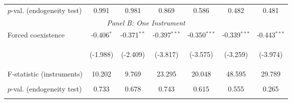 \begin{center}
\begin{tabular}{lcccccc}
\noalign{\smallskip}$ p$-val. (endogeneity test) & 0.991 & 0.981 & 0.869 & 0.586 & 0.482 & 0.481\\
\multicolumn{7}{c}{\textit{Panel B: One Instrument}}\\
\noalign{\smallskip}Forced coexistence & -0.406$ ^*$ & -0.371$ ^{**}$ & -0.397$ ^{***}$ & -0.350$ ^{***}$ & -0.339$ ^{***}$ & -0.443$ ^{***}$\\
 & \begin{footnotesize}(-1.988)\end{footnotesize} & \begin{footnotesize}(-2.409)\end{footnotesize} & \begin{footnotesize}(-3.817)\end{footnotesize} & \begin{footnotesize}(-3.575)\end{footnotesize} & \begin{footnotesize}(-3.259)\end{footnotesize} & \begin{footnotesize}(-3.974)\end{footnotesize}\\
\noalign{\smallskip}F-statistic (instruments) & 10.202 & 9.769 & 23.295 & 20.048 & 48.595 & 29.789\\
 & \begin{footnotesize}\end{footnotesize} & \begin{footnotesize}\end{footnotesize} & \begin{footnotesize}\end{footnotesize} & \begin{footnotesize}\end{footnotesize} & \begin{footnotesize}\end{footnotesize} & \begin{footnotesize}\end{footnotesize}\\
\noalign{\smallskip}$ p$-val. (endogeneity test) & 0.733 & 0.678 & 0.743 & 0.615 & 0.555 & 0.265\\
 & \begin{footnotesize}\end{footnotesize} & \begin{footnotesize}\end{footnotesize} & \begin{footnotesize}\end{footnotesize} & \begin{footnotesize}\end{footnotesize} & \begin{footnotesize}\end{footnotesize} & \begin{footnotesize}\end{footnotesize}\\

\end{tabular}
\end{center}
